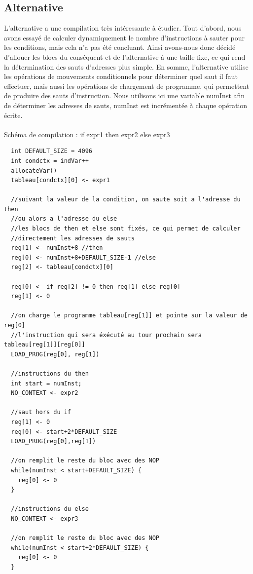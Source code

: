\documentclass[a4paper,12pt]{report}
\begin{document}
\subsection{Alternative}
L'alternative a une compilation très intéressante à étudier. Tout d'abord, nous avons essayé de calculer dynamiquement le nombre
d'instructions à sauter pour les conditions, mais cela n'a pas été concluant. Ainsi avons-nous donc décidé d'allouer les blocs du 
conséquent et de l'alternative à une taille fixe, ce qui rend la détermination des sauts d'adresses plus simple.
En somme, l'alternative utilise les opérations de mouvements conditionnels pour déterminer quel saut il faut effectuer, mais aussi les
opérations de chargement de programme, qui permettent de produire des sauts d'instruction.
Nous utilisons ici une variable numInst afin de déterminer les adresses de sauts, numInst est incrémentée à chaque opération écrite.
\\ \\
Schéma de compilation : if expr1 then expr2 else expr3
\begin{verbatim}
  int DEFAULT_SIZE = 4096
  int condctx = indVar++
  allocateVar()
  tableau[condctx][0] <- expr1
  
  //suivant la valeur de la condition, on saute soit a l'adresse du then
  //ou alors a l'adresse du else
  //les blocs de then et else sont fixés, ce qui permet de calculer
  //directement les adresses de sauts
  reg[1] <- numInst+8 //then
  reg[0] <- numInst+8+DEFAULT_SIZE-1 //else
  reg[2] <- tableau[condctx][0]
  
  reg[0] <- if reg[2] != 0 then reg[1] else reg[0]
  reg[1] <- 0
  
  //on charge le programme tableau[reg[1]] et pointe sur la valeur de reg[0]
  //l'instruction qui sera éxécuté au tour prochain sera tableau[reg[1]][reg[0]]
  LOAD_PROG(reg[0], reg[1])
    
  //instructions du then
  int start = numInst;
  NO_CONTEXT <- expr2
    
  //saut hors du if
  reg[1] <- 0
  reg[0] <- start+2*DEFAULT_SIZE
  LOAD_PROG(reg[0],reg[1])
    
  //on remplit le reste du bloc avec des NOP
  while(numInst < start+DEFAULT_SIZE) {
    reg[0] <- 0
  }
    
  //instructions du else
  NO_CONTEXT <- expr3
    
  //on remplit le reste du bloc avec des NOP
  while(numInst < start+2*DEFAULT_SIZE) {
    reg[0] <- 0
  }
\end{verbatim}
\end{document}
